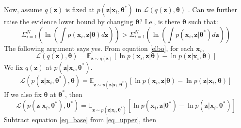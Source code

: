 \documentclass[a4]{article}
\begin{document}
Now, assume $q(\mathbf{z})$ is fixed at 
$p(\mathbf{z}|\mathbf{x}_i,\bm{\theta^*})$ in 
$\mathcal{L}(q(\mathbf{z}), \bm{\theta})$ .
Can we further raise the evidence lower bound by changing $\bm{\theta}$?
I.e., is there $\bm{\theta}$ such that:
\[
\Sigma_{i = 1}^N \left(
    \ln \left( \int p(\mathbf{x}_i,\mathbf{z}|\bm{\theta})d\mathbf{z} \right)
\right)  
>
\Sigma_{i = 1}^N \left(
    \ln \left( \int p(\mathbf{x}_i,\mathbf{z}|\bm{\theta^*})d\mathbf{z} \right)
\right) 
\]
The following argument says yes.
From equation \ref{elbo}, for each $\mathbf{x}_i$, 
\begin{equation}
    \mathcal{L}(q(\mathbf{z}), \bm{\theta})
= 
    \mathbb{E}_{\mathbf{z}\sim q(\mathbf{z}) }\left[
          \ln p( \mathbf{x}_i,\mathbf{z}|\bm{\theta} )
        - \ln p( \mathbf{z}|\mathbf{x}_i,\bm{\theta} )
    \right]
\end{equation}
We fix $q(\mathbf{z})$ at $p(\mathbf{z}|\mathbf{x}_i,\bm{\theta^*})$.
\begin{equation}
    \mathcal{L}( p( \mathbf{z} | \mathbf{x}_i, \bm{\theta^*} ), \bm{\theta} )
= 
    \mathbb{E}_{\mathbf{z}\sim p(\mathbf{z}|\mathbf{x}_i,\bm{\theta^*}) }\left[
          \ln p( \mathbf{x}_i,\mathbf{z} | \bm{\theta} ) 
        - \ln p( \mathbf{z} | \mathbf{x}_i,\bm{\theta} )
    \right]\label{eq_upper}
\end{equation}
If we also fix $\bm{\theta}$ at $\bm{\theta^*}$, then
\begin{equation}
    \mathcal{L}( p(\mathbf{z} | \mathbf{x}_i,\bm{\theta^*} ), \bm{\theta^*} )
= 
    \mathbb{E}_{\mathbf{z}\sim p(\mathbf{z}|\mathbf{x}_i,\bm{\theta^*}) }\left[
          \ln p( \mathbf{x}_i,\mathbf{z} | \bm{\theta^*} ) 
        - \ln p( \mathbf{z} | \mathbf{x}_i, \bm{\theta^*} ) 
    \right]\label{eq_base}
\end{equation}
Subtract equation \ref{eq_base} from \ref{eq_upper}, then
\end{document}
